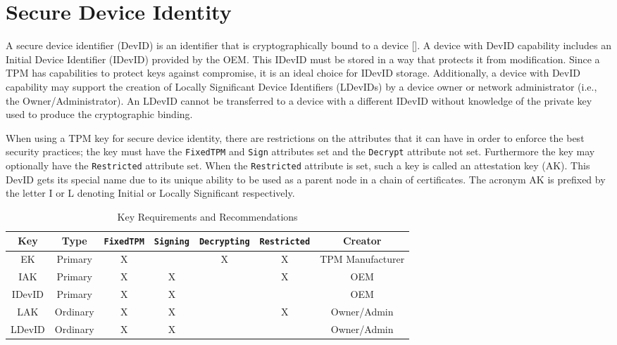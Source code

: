 \chapter{Secure Device Identity}

A secure device identifier (DevID) is an identifier that is cryptographically bound to a device [\cite{DevIDSpec-IEEE}]. A device with DevID capability includes an Initial Device Identifier (IDevID) provided by the OEM. This IDevID must be stored in a way that protects it from modification. Since a TPM has capabilities to protect keys against compromise, it is an ideal choice for IDevID storage. Additionally, a device with DevID capability may support the creation of Locally Significant Device Identifiers (LDevIDs) by a device owner or network administrator (i.e., the Owner/Administrator). An LDevID cannot be transferred to a device with a different IDevID without knowledge of the private key used to produce the cryptographic binding.

When using a TPM key for secure device identity, there are restrictions on the attributes that it can have in order to enforce the best security practices; the key must have the \texttt{FixedTPM} and \texttt{Sign} attributes set and the \texttt{Decrypt} attribute not set. Furthermore the key may optionally have the \texttt{Restricted} attribute set. When the \texttt{Restricted} attribute is set, such a key is called an attestation key (AK). This DevID gets its special name due to its unique ability to be used as a parent node in a chain of certificates. The acronym AK is prefixed by the letter I or L denoting Initial or Locally Significant respectively. 



\begin{table}[h]
  \begin{center}
    \scriptsize 
    \sffamily
    \renewcommand{\arraystretch}{1.5}
    \begin{tabular}{ |c|c|c|c|c|c|c| }
      \hline
      Key & Type & \verb|FixedTPM| & \verb|Signing| & \verb|Decrypting| & \verb|Restricted| & Creator \\
      \hline
      \hline
      EK & Primary       & X &   & X & X & TPM Manufacturer \\
      \hline
      IAK & Primary      & X & X &   & X & OEM \\
      \hline
      IDevID & Primary   & X & X &   &   & OEM \\
      \hline
      LAK & Ordinary     & X & X &   & X & Owner/Admin \\
      \hline
      LDevID & Ordinary  & X & X &   &   & Owner/Admin \\
      \hline
    \end{tabular}
    \caption{Key Requirements and Recommendations}
    \label{fig:req_and_recs}
  \end{center}
\end{table}

